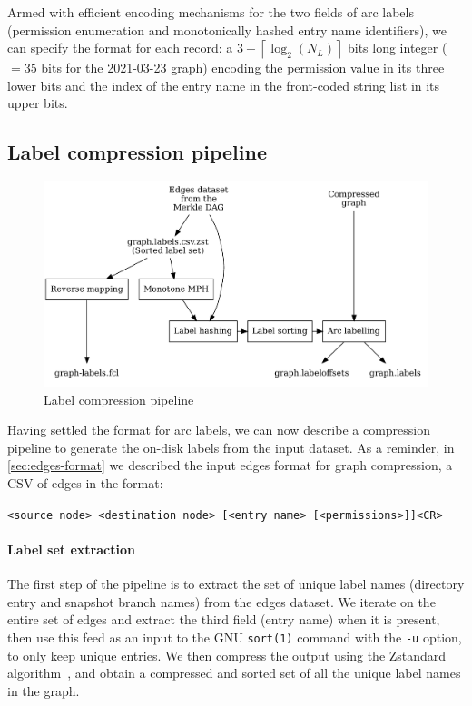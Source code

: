 Armed with efficient encoding mechanisms for the two fields of arc labels
(permission enumeration and monotonically hashed entry name identifiers), we
can specify the format for each record: a $3 +
\left\lceil{\log_2(N_L)}\right\rceil$ bits long integer ($= 35$ bits for
the 2021-03-23 graph) encoding the permission value in its three lower bits and
the index of the entry name in the front-coded string list in its upper bits.

\subsection{Label compression pipeline}

\begin{figure}
    \centering
    \includegraphics[width=\textwidth]{img/graph-properties/label-compression}
    \caption{Label compression pipeline}%
    \label{fig:label-compression-pipeline}
\end{figure}


Having settled the format for arc labels, we can now describe a compression
pipeline to generate the on-disk labels from the input dataset. As a reminder,
in \cref{sec:edges-format} we described the input edges format for graph
compression, a CSV of edges in the format:

\texttt{<source node> <destination node> [<entry name> [<permissions>]]<CR>}

\paragraph{Label set extraction}
The first step of the pipeline is to extract the set of unique label names
(directory entry and snapshot branch names) from the edges dataset. We iterate
on the entire set of edges and extract the third field (entry name) when it is
present, then use this feed as an input to the GNU \texttt{sort(1)} command
with the \texttt{-u} option, to only keep unique entries. We then compress the
output using the Zstandard algorithm~\cite{collet2015zstd}, and obtain a
compressed and sorted set of all the unique label names in the graph.

